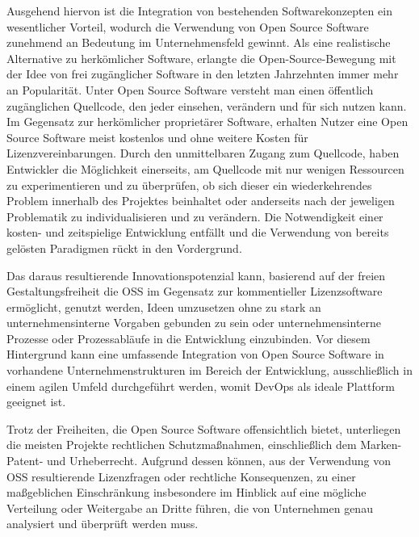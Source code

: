 Ausgehend hiervon ist die Integration von bestehenden Softwarekonzepten ein wesentlicher Vorteil, wodurch die Verwendung von Open Source Software zunehmend an Bedeutung im Unternehmensfeld gewinnt. Als eine realistische Alternative zu herkömlicher Software, erlangte die Open-Source-Bewegung mit der Idee von frei zugänglicher Software in den letzten Jahrzehnten immer mehr an Popularität. Unter Open Source Software versteht man einen öffentlich zugänglichen Quellcode, den jeder einsehen, verändern und für sich nutzen kann. Im Gegensatz zur herkömlicher proprietärer Software, erhalten Nutzer eine Open Source Software meist kostenlos und ohne weitere Kosten für Lizenzvereinbarungen. Durch den unmittelbaren Zugang zum Quellcode, haben Entwickler die Möglichkeit einerseits, am Quellcode mit nur wenigen Ressourcen zu experimentieren und zu überprüfen, ob sich dieser ein wiederkehrendes Problem innerhalb des Projektes beinhaltet oder anderseits nach der jeweligen Problematik zu individualisieren und zu verändern. Die Notwendigkeit einer kosten- und zeitspielige Entwicklung entfällt und die Verwendung von bereits gelösten Paradigmen rückt in den Vordergrund.   


Das daraus resultierende Innovationspotenzial kann, basierend auf der freien Gestaltungsfreiheit die OSS im Gegensatz zur kommentieller Lizenzsoftware ermöglicht, genutzt werden, Ideen umzusetzen ohne zu stark an unternehmensinterne Vorgaben gebunden zu sein oder unternehmensinterne Prozesse oder Prozessabläufe in die Entwicklung einzubinden. Vor diesem Hintergrund kann eine umfassende Integration von Open Source Software in vorhandene Unternehmenstrukturen im Bereich der Entwicklung, ausschließlich in einem agilen Umfeld durchgeführt werden, womit DevOps als ideale Plattform geeignet ist.  

Trotz der Freiheiten, die Open Source Software offensichtlich bietet, unterliegen die meisten Projekte rechtlichen Schutzmaßnahmen, einschließlich dem Marken- Patent- und Urheberrecht. Aufgrund dessen können, aus der Verwendung von OSS resultierende Lizenzfragen oder rechtliche Konsequenzen, zu einer maßgeblichen Einschränkung insbesondere im Hinblick auf eine mögliche Verteilung oder Weitergabe an Dritte führen, die von Unternehmen genau analysiert und überprüft werden muss.  

